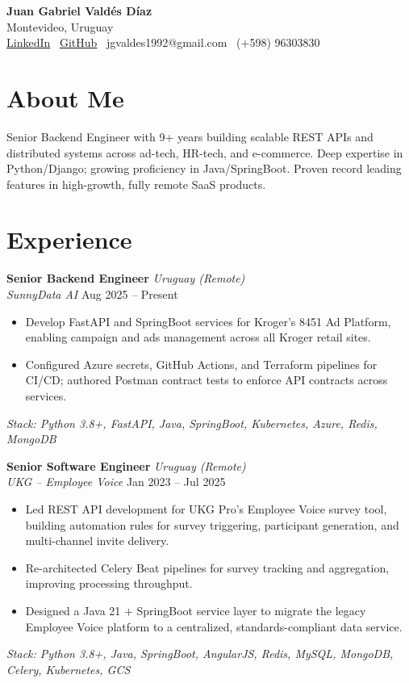 \documentclass[10pt, letterpaper]{article}
\newcommand{\jobtitle}[4]{%
    \textbf{#1} \hfill \textit{#2}\\[-1pt]%
    \textit{#3} \hfill #4%
}
\newcommand{\jobstack}[1]{\vspace{0pt}\textit{\small Stack: #1}}
\newcommand{\entrysep}{\vspace{4pt}}
\begin{document}

\begin{center}
    {\Huge\bfseries Juan Gabriel Vald\'{e}s D\'{i}az}\\[3pt]
    Montevideo, Uruguay\\[2pt]
    \href{https://linkedin.com/in/jg-valdes}{LinkedIn}
    \textbar\
    \href{https://github.com/jg-valdes}{GitHub}
    \textbar\
    jgvaldes1992@gmail.com
    \textbar\
    (+598) 96303830
\end{center}

\vspace{1pt}

\section{About Me}

Senior Backend Engineer with 9+ years building scalable REST APIs and distributed systems across
ad-tech, HR-tech, and e-commerce. Deep expertise in Python/Django; growing proficiency in
Java/SpringBoot. Proven record leading features in high-growth, fully remote SaaS products.

\section{Experience}

\jobtitle{Senior Backend Engineer}{Uruguay (Remote)}{SunnyData AI}{Aug 2025 -- Present}
\begin{itemize}
    \item Develop FastAPI and SpringBoot services for Kroger's 8451 Ad Platform, enabling campaign
          and ads management across all Kroger retail sites.
    \item Configured Azure secrets, GitHub Actions, and Terraform pipelines for CI/CD; authored
          Postman contract tests to enforce API contracts across services.
\end{itemize}
\jobstack{Python 3.8+, FastAPI, Java, SpringBoot, Kubernetes, Azure, Redis, MongoDB}

\entrysep

\jobtitle{Senior Software Engineer}{Uruguay (Remote)}{UKG -- Employee Voice}{Jan 2023 -- Jul 2025}
\begin{itemize}
    \item Led REST API development for UKG Pro's Employee Voice survey tool, building automation
          rules for survey triggering, participant generation, and multi-channel invite delivery.
    \item Re-architected Celery Beat pipelines for survey tracking and aggregation, improving
          processing throughput.
    \item Designed a Java 21 + SpringBoot service layer to migrate the legacy Employee Voice
          platform to a centralized, standards-compliant data service.
\end{itemize}
\jobstack{Python 3.8+, Java, SpringBoot, AngularJS, Redis, MySQL, MongoDB, Celery, Kubernetes, GCS}
\end{document}
